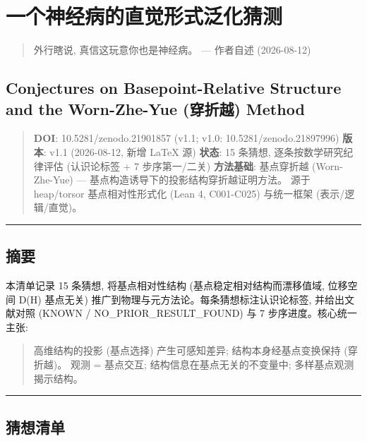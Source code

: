 \documentclass[
]{article}
\author{}
\date{}
\begin{document}
\section{一个神经病的直觉形式泛化猜测}\label{ux4e00ux4e2aux795eux7ecfux75c5ux7684ux76f4ux89c9ux5f62ux5f0fux6cdbux5316ux731cux6d4b}

\begin{quote}
外行瞎说, 真信这玩意你也是神经病。 --- 作者自述 (2026-08-12)
\end{quote}

\subsection{Conjectures on Basepoint-Relative Structure and the
Worn-Zhe-Yue (穿折越)
Method}\label{conjectures-on-basepoint-relative-structure-and-the-worn-zhe-yue-ux7a7fux6298ux8d8a-method}

\begin{quote}
\textbf{DOI}: 10.5281/zenodo.21901857 (v1.1; v1.0:
10.5281/zenodo.21897996) \textbf{版本}: v1.1 (2026-08-12, 新增 LaTeX 源)
\textbf{状态}: 15 条猜想, 逐条按数学研究纪律评估 (认识论标签 + 7
步序第一/二关) \textbf{方法基础}: 基点穿折越 (Worn-Zhe-Yue) ---
基点构造诱导下的投影结构穿折越证明方法。 源于 heap/torsor
基点相对性形式化 (Lean 4, C001-C025) 与统一框架 (表示/逻辑/直觉)。
\end{quote}

\begin{center}\rule{0.5\linewidth}{0.5pt}\end{center}

\subsection{摘要}\label{ux6458ux8981}

本清单记录 15 条猜想, 将基点相对性结构 (基点稳定相对结构而漂移值域,
位移空间 D(H) 基点无关) 推广到物理与元方法论。每条猜想标注认识论标签,
并给出文献对照 (KNOWN / NO\_PRIOR\_RESULT\_FOUND) 与 7
步序进度。核心统一主张:

\begin{quote}
高维结构的投影 (基点选择) 产生可感知差异; 结构本身经基点变换保持
(穿折越)。 观测 = 基点交互; 结构信息在基点无关的不变量中;
多样基点观测揭示结构。
\end{quote}

\begin{center}\rule{0.5\linewidth}{0.5pt}\end{center}

\subsection{猜想清单}\label{ux731cux60f3ux6e05ux5355}
\end{document}
